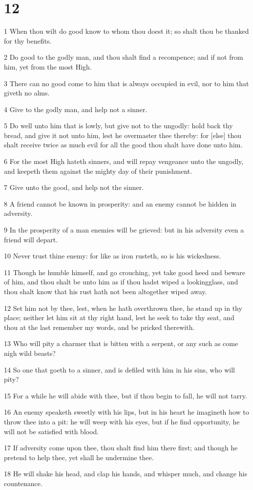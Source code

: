 \chapter{12}

\par 1 When thou wilt do good know to whom thou doest it; so shalt thou be thanked for thy benefits.
\par 2 Do good to the godly man, and thou shalt find a recompence; and if not from him, yet from the most High.
\par 3 There can no good come to him that is always occupied in evil, nor to him that giveth no alms.
\par 4 Give to the godly man, and help not a sinner.
\par 5 Do well unto him that is lowly, but give not to the ungodly: hold back thy bread, and give it not unto him, lest he overmaster thee thereby: for [else] thou shalt receive twice as much evil for all the good thou shalt have done unto him.
\par 6 For the most High hateth sinners, and will repay vengeance unto the ungodly, and keepeth them against the mighty day of their punishment.
\par 7 Give unto the good, and help not the sinner.
\par 8 A friend cannot be known in prosperity: and an enemy cannot be hidden in adversity.
\par 9 In the prosperity of a man enemies will be grieved: but in his adversity even a friend will depart.
\par 10 Never trust thine enemy: for like as iron rusteth, so is his wickedness.
\par 11 Though he humble himself, and go crouching, yet take good heed and beware of him, and thou shalt be unto him as if thou hadst wiped a lookingglass, and thou shalt know that his rust hath not been altogether wiped away.
\par 12 Set him not by thee, lest, when he hath overthrown thee, he stand up in thy place; neither let him sit at thy right hand, lest he seek to take thy seat, and thou at the last remember my words, and be pricked therewith.
\par 13 Who will pity a charmer that is bitten with a serpent, or any such as come nigh wild beasts?
\par 14 So one that goeth to a sinner, and is defiled with him in his sins, who will pity?
\par 15 For a while he will abide with thee, but if thou begin to fall, he will not tarry.
\par 16 An enemy speaketh sweetly with his lips, but in his heart he imagineth how to throw thee into a pit: he will weep with his eyes, but if he find opportunity, he will not be satisfied with blood.
\par 17 If adversity come upon thee, thou shalt find him there first; and though he pretend to help thee, yet shall he undermine thee.
\par 18 He will shake his head, and clap his hands, and whisper much, and change his countenance.

